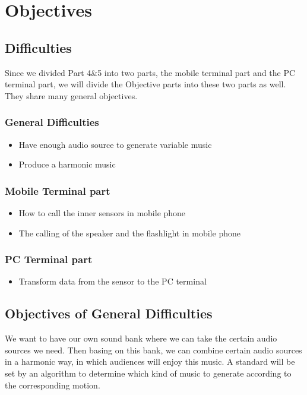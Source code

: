 \section{Objectives}
\subsection{Difficulties}
\hspace*{2em}Since we divided Part 4\&5 into two parts, the mobile terminal part
and the PC terminal part, we will divide the Objective parts into these two
parts as well. They share many general objectives. 

\subsubsection{General Difficulties}
\begin{itemize}
\item Have enough audio source to generate variable music
\item Produce a harmonic music
\end{itemize}

\subsubsection{Mobile Terminal part}
\begin{itemize}
\item How to call the inner sensors in mobile phone
\item The calling of the speaker and the flashlight in mobile phone 
\end{itemize}

\subsubsection{PC Terminal part}
\begin{itemize}
\item Transform data from the sensor to the PC terminal
\end{itemize}



\subsection{Objectives of General Difficulties}

We want to have our own sound bank where we can take the certain audio sources
we need. Then basing on this bank, we can combine certain audio sources in a
harmonic way, in which audiences will enjoy this music. 
A standard will be set by an algorithm to determine which kind of music to
generate according to the corresponding motion. 

